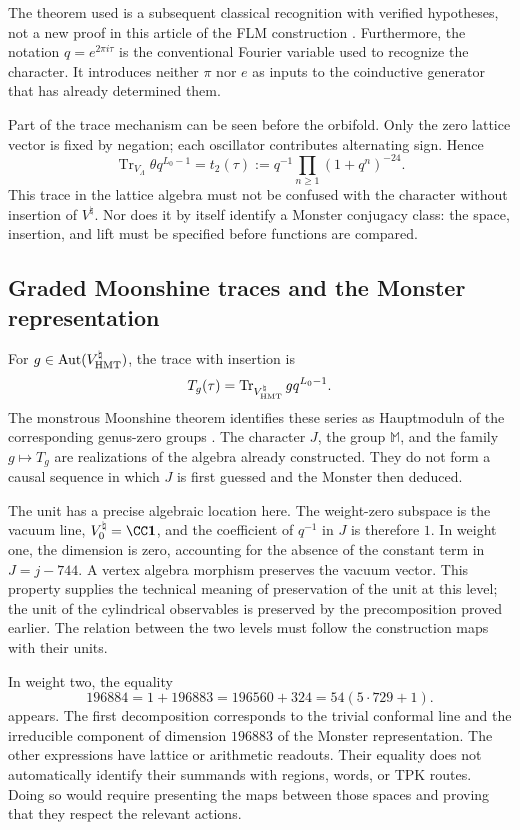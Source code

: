 The theorem used is a subsequent classical recognition with
verified hypotheses, not a new proof in this article of the
FLM construction \cite{flm}.
Furthermore, the notation $q=e^{2\pi i\tau}$ is the conventional Fourier
variable used to recognize the character. It introduces neither $\pi$
nor $e$ as inputs to the coinductive generator that has already determined them.

Part of the trace mechanism can be seen before the orbifold.
Only the zero lattice vector is fixed by negation; each
oscillator contributes alternating sign. Hence
\[
 \operatorname{Tr}_{V_\Lambda}\theta q^{L_0-1}
   =t_2(\tau)
   :=q^{-1}\prod_{n\geq1}(1+q^n)^{-24}.
\]
This trace in the lattice algebra must not be confused with the
character without insertion of $V^\natural$. Nor does it by itself identify
a Monster conjugacy class: the space, insertion,
and lift must be specified before functions are compared.



\subsection{Graded Moonshine traces and the Monster representation}
\label{exc:alcance}

For $g\in\operatorname{Aut}(V^\natural_{\rm HMT})$, the trace
with insertion is
\[
 T_g(\tau)=
 \operatorname{Tr}_{V^\natural_{\rm HMT}}gq^{L_0-1}.
\]
The monstrous Moonshine theorem identifies these series as
Hauptmoduln of the corresponding genus-zero groups
\cite[Theorem~1.1]{borcherds}.
The character $J$, the group $\mathbb M$, and the family $g\mapsto T_g$
are realizations of the algebra already constructed. They do not form a causal
sequence in which $J$ is first guessed and the Monster then deduced.

The unit has a precise algebraic location here. The weight-zero
subspace is the vacuum line, \(V^\natural_0=\CC\mathbf1\), and
the coefficient of \(q^{-1}\) in \(J\) is therefore \(1\). In weight one,
the dimension is zero, accounting for the absence of the constant term
in \(J=j-744\). A vertex algebra morphism preserves the vacuum
vector. This property supplies the technical meaning of preservation
of the unit at this level; the unit of the cylindrical observables
is preserved by the precomposition proved earlier. The relation
between the two levels must follow the construction maps with their units.

In weight two, the equality
\[
 196884=1+196883=196560+324=54(5\cdot729+1).
\]
appears.
The first decomposition corresponds to the trivial conformal line and the
irreducible component of dimension $196883$ of the Monster
representation. The other expressions have lattice or arithmetic
readouts. Their equality does not automatically identify their summands
with regions, words, or TPK routes. Doing so would require
presenting the maps between those spaces and proving that they respect the
relevant actions.


